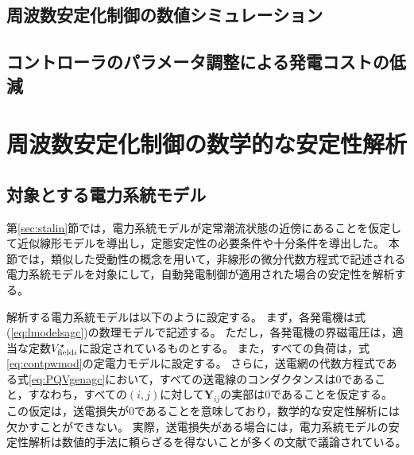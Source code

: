 \documentclass[tombow,dvipdfmx]{corona-a5}
\begin{document}
\subsection{周波数安定化制御の数値シミュレーション}



\subsection{コントローラのパラメータ調整による発電コストの低減}\label{sec:conpeco}




\section{周波数安定化制御の数学的な安定性解析\advanced}

\subsection{対象とする電力系統モデル}\label{sec:objmod}

第\ref{sec:stalin}節では，電力系統モデルが定常潮流状態の近傍にあることを仮定して近似線形モデルを導出し，定態安定性の必要条件や十分条件を導出した。
本節では，類似した受動性の概念を用いて，非線形の微分代数方程式で記述される電力系統モデルを対象にして，自動発電制御が適用された場合の安定性を解析する。

解析する電力系統モデルは以下のように設定する。
まず，各発電機は式(\ref{eq:lmodelsagc})の数理モデルで記述する。
ただし，各発電機の界磁電圧は，適当な定数$V_{{\rm field}i}^{\star}$に設定されているものとする。
また，すべての負荷は，式\ref{eq:contpwmod}の定電力モデルに設定する。
さらに，送電網の代数方程式である式\ref{eq:PQVgenagc}において，すべての送電線のコンダクタンスは0であること，すなわち，すべての$(i,j)$に対して$\bm{Y}_{ij}$の実部は0であることを仮定する。
この仮定は，送電損失が0であることを意味しており，数学的な安定性解析には欠かすことができない。
実際，送電損失がある場合には，電力系統モデルの安定性解析は数値的手法に頼らざるを得ないことが多くの文献で議論されている\cite{narasimhamurthi1984existence,yang2019distributed}。
\end{document}
